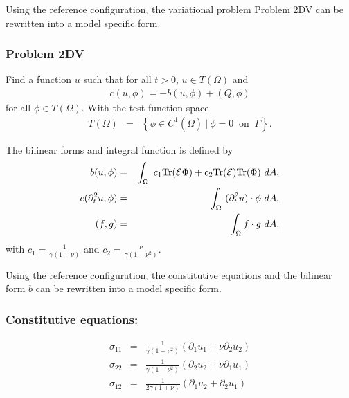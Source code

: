 \FloatBarrier

 Using the reference configuration, the variational problem Problem 2DV can be rewritten into a model specific form.

\subsubsection*{Problem 2DV}\label{sssec:2D_Model:Problem2D1VChp5}
Find a function $u$ such that for all $t>0$, $u \in T(\Omega)$ and 
\begin{align}
	c(u,\phi) = -b(u,\phi) + (Q,\phi) \label{eq:2D_Model:Problem2D1VEqChp5}
\end{align}
for all $\phi \in T(\Omega)$. With the test function space 
\begin{eqnarray*}
	T(\Omega) & = & \left\{ \phi \in C^1(\bar{\Omega}) \ | \ \phi = 0 \ \textrm{ on } \ \Gamma \right\}.
\end{eqnarray*}

The bilinear forms and integral function is defined by
\begin{eqnarray}
	b(u,\phi) & = & \int_\Omega~c_1\textrm{Tr}({\cal E}\Phi)+ c_2\textrm{Tr}({\cal E})
	\textrm{Tr}(\Phi) ~dA, \label{eq:2D_Model:BilinearChp5}\\
	c(\partial_t^2 u,\phi) & = & \int_\Omega~ (\partial^2_t u) \cdot \phi~dA, \label{eq:2D_Model:Bilinear_cChp5}\\
	(f,g) &=& \int_{\Omega} f\cdot g \ dA, \label{eq:2D_Model:Bilinear_intChp5}
\end{eqnarray}
with $\displaystyle c_1 = \frac{1}{\gamma(1+\nu)}$ and $\displaystyle c_2 = \frac{\nu}{\gamma(1-\nu^2)}$.

Using the reference configuration, the constitutive equations and the bilinear form $b$ can be rewritten into a model specific form.

\subsubsection*{Constitutive equations:}
\begin{eqnarray}
	\sigma_{11} & = & \frac{1}{\gamma(1-\nu^2)}(\partial_1 u_1 + \nu \partial_2 u_2) \label{CE1} \\
	\sigma_{22} & = & \frac{1}{\gamma(1-\nu^2)}(\partial_2 u_2 + \nu \partial_1 u_1) \label{CE2} \\
	\sigma_{12} & = & \frac{1}{2\gamma(1+\nu)}(\partial_1 u_2 + \partial_2 u_1) \label{CE3}
\end{eqnarray}

